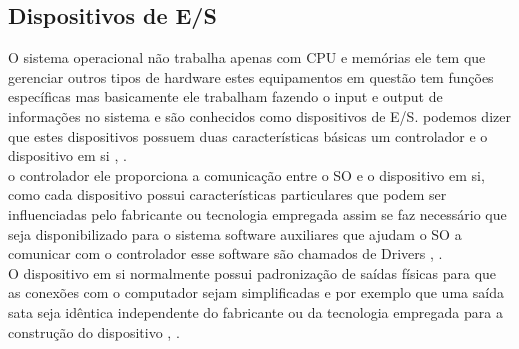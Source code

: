 \subsection{Dispositivos de E/S}
O sistema operacional não trabalha apenas com CPU e memórias ele tem que gerenciar outros tipos de hardware estes equipamentos em questão tem funções específicas mas basicamente ele trabalham fazendo o input e output de informações no sistema e são conhecidos como dispositivos de E/S. podemos dizer que estes dispositivos possuem duas características básicas um controlador e o dispositivo em si \cite{Tanenbaum2016}, \cite{Comer2012}.\\
o controlador ele proporciona a comunicação entre o SO e o dispositivo em si, como cada dispositivo possui características particulares que podem ser influenciadas pelo fabricante ou tecnologia empregada assim se faz necessário que seja disponibilizado para o sistema software auxiliares que ajudam o SO a comunicar com o controlador esse software são chamados de Drivers \cite{Tanenbaum2016}, \cite{Comer2012}.\\
O dispositivo em si normalmente possui padronização de saídas físicas para que as conexões com o computador sejam simplificadas e por exemplo que uma saída sata seja idêntica independente do fabricante ou da tecnologia empregada para a construção do dispositivo \cite{Tanenbaum2016}, \cite{Comer2012}.\\
